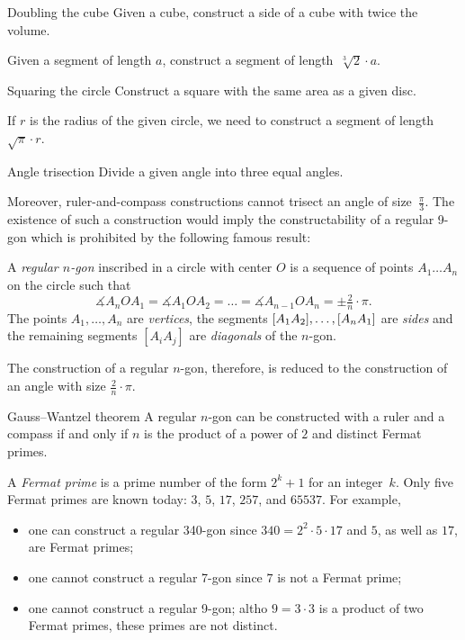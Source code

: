 \begin{thm*}{Doubling the cube}
Given a cube, construct a side of a cube with twice the volume.
\end{thm*}

Given a segment of length $a$,
construct a segment of length~$\sqrt[3]{2}\cdot a$.

\begin{thm*}{Squaring the circle}
Construct a square with the same area as a given disc.
\end{thm*}

If $r$ is the radius of the given circle, we need to construct a segment of length~$\sqrt{\pi}\cdot r$. 

\begin{thm*}{Angle trisection} 
Divide a given angle into three equal angles.
\end{thm*}

Moreover, ruler-and-compass constructions cannot trisect an angle of size~$\tfrac\pi3$. 
The existence of such a construction would imply the constructability of a regular 9-gon which is prohibited by the following famous result:

A \emph{regular $n$-gon} inscribed in a circle with center $O$ is a sequence of points $A_1\dots A_n$ on the circle such that 
\[\measuredangle A_nOA_1=\measuredangle A_1OA_2=\dots=\measuredangle A_{n-1}OA_n=\pm\tfrac2n\cdot \pi.\]
The points $A_1,\dots, A_n$ are \emph{vertices},
the segments $[A_1A_2], \dots, [A_nA_1]$ are \emph{sides} 
and the remaining segments $[A_iA_j]$ are \emph{diagonals} of the $n$-gon.

The construction of a regular $n$-gon, therefore, is reduced to the construction of an angle with size $\tfrac2n\cdot \pi$.

\begin{thm}{Gauss--Wantzel theorem}
A regular $n$-gon can be constructed with a ruler and a compass 
if and only if 
$n$ is the product of a power of $2$ and distinct Fermat primes.
\end{thm}

A \emph{Fermat prime} is a prime number of the form $2^k+1$ for an integer~$k$.
Only five Fermat primes are known  today: $3$, $5$, $17$, $257$, and $65537$.
For example, 
\begin{itemize}
\item one can construct a regular 340-gon since $340=2^2\cdot 5\cdot 17$ and $5$, as well as $17$, are Fermat primes;
\item one cannot construct a regular 7-gon since $7$ is not a Fermat prime;
\item one cannot construct a regular 9-gon; 
altho $9=3\cdot 3$ is a product of two Fermat primes, 
these primes are not distinct.
\end{itemize}


